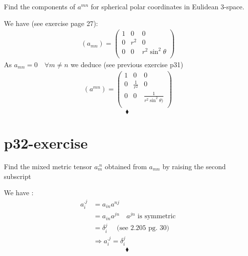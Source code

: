\begin{tcolorbox}
Find the components of $a^{mn}$ for spherical polar coordinates in Eulidean 3-space.
\end{tcolorbox}
We have (see exercise page 27):
\begin{align}
\ (a_{mn}) = \begin{pmatrix}
 1& 0 & 0\\
0 & r^2 & 0 \\
0 & 0 & r^2\sin^2\theta \\
\end{pmatrix}
\end{align}
As $a_{mn} = 0 \quad \forall m \neq n$ we deduce (see previous exercise p31)
\begin{align}
\ (a^{mn}) = \begin{pmatrix}
 1& 0 & 0\\
0 & \frac{1}{r^2} & 0 \\
0 & 0 & \frac{1}{r^2\sin^2\theta)}\\
\end{pmatrix}
\end{align}
$$\blacklozenge$$
\newpage

\section{p32-exercise}

\begin{tcolorbox}
Find the mixed metric tensor  $a^{.n}_m$ obtained from $a_{mn}$ by raising the second subscript
\end{tcolorbox}
We have :
\begin{align}
\ a_{i}^{.j} &=  a_{in}a^{nj}\\
\ &=  a_{in}a^{jn}\quad a^{jn} \text{  is symmetric}\\
\ &= \delta^j_i \quad \text{ (see 2.205 pg. 30)}\\
\ &\Rightarrow a_{i}^{.j} = \delta^j_i 
\end{align}
$$\blacklozenge$$
\newpage

